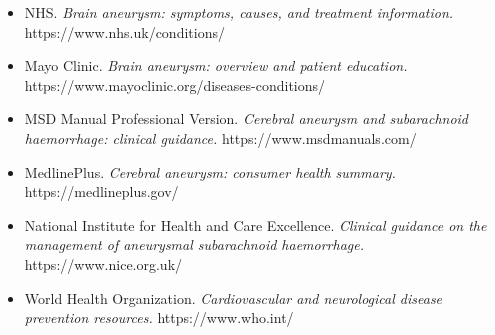 \begin{itemize}
    \item NHS. \textit{Brain aneurysm: symptoms, causes, and treatment information.} https://www.nhs.uk/conditions/
    \item Mayo Clinic. \textit{Brain aneurysm: overview and patient education.} https://www.mayoclinic.org/diseases-conditions/
    \item MSD Manual Professional Version. \textit{Cerebral aneurysm and subarachnoid haemorrhage: clinical guidance.} https://www.msdmanuals.com/
    \item MedlinePlus. \textit{Cerebral aneurysm: consumer health summary.} https://medlineplus.gov/
    \item National Institute for Health and Care Excellence. \textit{Clinical guidance on the management of aneurysmal subarachnoid haemorrhage.} https://www.nice.org.uk/
    \item World Health Organization. \textit{Cardiovascular and neurological disease prevention resources.} https://www.who.int/
\end{itemize}
